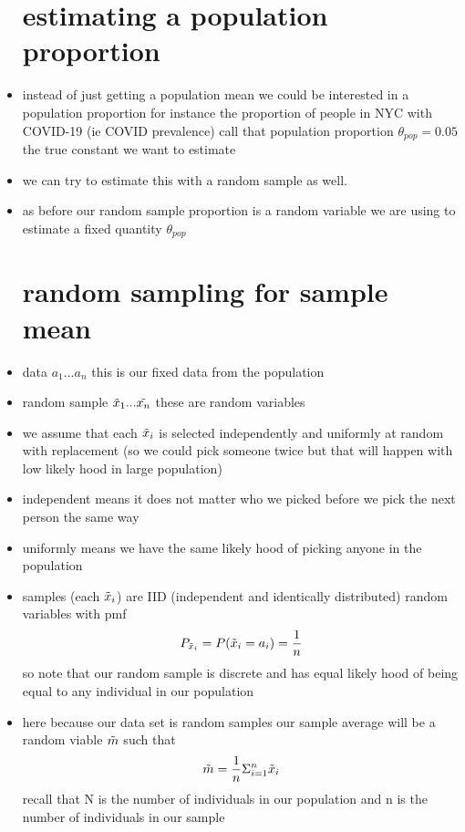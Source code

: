 \documentclass{article}
\begin{document}
\begin{itemize}
\section{estimating a population proportion}
\item instead of just getting a population mean we could be interested in a population proportion for instance the proportion of people in NYC with COVID-19 (ie COVID prevalence) call that population proportion $\theta_{pop}=0.05$ the true constant we want to estimate
\item we can try to estimate this with a random sample as well. 
\item as before our random sample proportion is a random variable we are using to estimate a fixed quantity $\theta_{pop}$
\section{random sampling for sample mean}
\item data $a_1...a_n$ this is our fixed data from the population 
\item random sample $\Tilde{x}_1...\Tilde{x_n}$ these are random variables 
\item we assume that each $\Tilde{x}_i$ is selected independently and uniformly at random with replacement (so we could pick someone twice but that will happen with low likely hood in large population)
\item independent means it does not matter who we picked before we pick the next person the same way 
\item uniformly means we have the same likely hood of picking anyone in the population 
\item samples (each $\Tilde{x}_i$) are IID (independent and identically distributed) random variables with pmf $$P_{\Tilde{x}_i}=P(\Tilde{x}_i=a_i)=\frac{1}{n}$$
so note that our random sample is discrete and has equal likely hood of being equal to any individual in our population 
\item here because our data set is random samples our sample average will be a random viable $\Tilde{m}$ such that $$\Tilde{m}=\frac{1}{n}\Sigma_{i=1}^{n}\Tilde{x}_i$$ recall that N is the number of individuals in our population and n is the number of individuals in our sample

\end{itemize}
\end{document}
